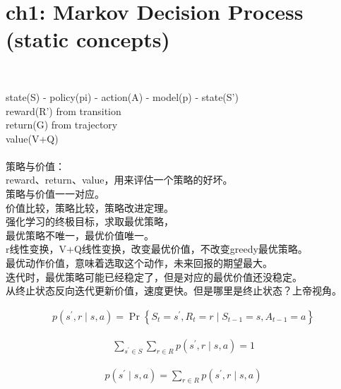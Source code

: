 \documentclass{article}
\begin{document}
\section*{ch1: Markov Decision Process (static concepts)}


~ \\[3pt]  %
\begin{CJK}{UTF8}{gbsn}
    state(S) - policy(pi) - action(A) - model(p) - state(S') \\[3pt]
    reward(R') from transition \\[3pt]
    return(G) from trajectory \\[3pt]
    value(V+Q) \\[3pt]

    ~ \\[3pt]
    策略与价值：\\[3pt]
    reward、return、value，用来评估一个策略的好坏。 \\[3pt]
    策略与价值一一对应。 \\[3pt]
    价值比较，策略比较，策略改进定理。 \\[3pt]
    强化学习的终极目标，求取最优策略， \\[3pt]
    最优策略不唯一，最优价值唯一。 \\[3pt]
    r线性变换，V+Q线性变换，改变最优价值，不改变greedy最优策略。 \\[3pt]
    最优动作价值，意味着选取这个动作，未来回报的期望最大。 \\[3pt]
    迭代时，最优策略可能已经稳定了，但是对应的最优价值还没稳定。 \\[3pt]
    从终止状态反向迭代更新价值，速度更快。但是哪里是终止状态？上帝视角。 \\[3pt]
\end{CJK}


\begin{align*}
    p \left( s^{\prime}, r \mid s, a \right) 
    = \operatorname{Pr} \left\{ S_{t}=s^{\prime}, R_{t}=r \mid 
    S_{t-1}=s, A_{t-1}=a \right\} 
\end{align*}

\begin{align*}
    \sum_{s^{\prime} \in S} \sum_{r \in R} 
    p \left( s^{\prime}, r \mid s, a \right) = 1 
\end{align*}

\begin{align*}
    p \left( s^{\prime} \mid s, a \right) 
    = \sum_{r \in R} p \left( s^{\prime}, r \mid s, a \right) 
\end{align*}
\end{document}
